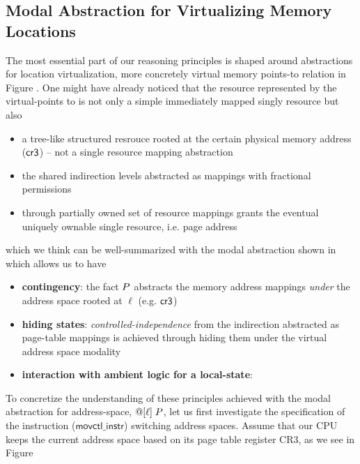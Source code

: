 \subsection{Modal Abstraction for Virtualizing Memory Locations}
\label{sec:modallocationvirtualization}

The most essential part of our reasoning principles is shaped around abstractions for location virtualization, more concretely virtual memory points-to relation in Figure . One might have already noticed that the resource represented by the virtual-points to is not only a simple immediately mapped singly resource but also
\begin{itemize}
\item a tree-like structured resrouce rooted at the certain physical memory address ($\mathsf{cr3}$) -- not a single resource mapping abstraction 
\item the shared indirection levels abstracted as mappings with fractional permissions
\item through partially owned set of resource mappings grants the eventual uniquely ownable single resource, i.e. page address 
\end{itemize}
which we think can be well-summarized with the modal abstraction shown in  which allows us to have
\begin{itemize}
  \item \textbf{contingency}: the fact $P$ abstracts the memory address mappings \textit{under} the address space rooted at $\ell$ (e.g. $\mathsf{cr3}$)
  \item \textbf{hiding states}: \textit{controlled-independence} from the indirection abstracted as page-table mappings is achieved through hiding them under the virtual address space modality
  \item \textbf{interaction with ambient logic for a local-state}: 
\end{itemize}

To concretize the understanding of these principles achieved with the modal abstraction for address-space, $@[\ell]\; P$, let us first investigate the specification of the instruction ($\textsf{movctl\_instr}$) switching address spaces. Assume that our CPU keeps the current address space based on its page table register CR3, as we see in Figure 
%


